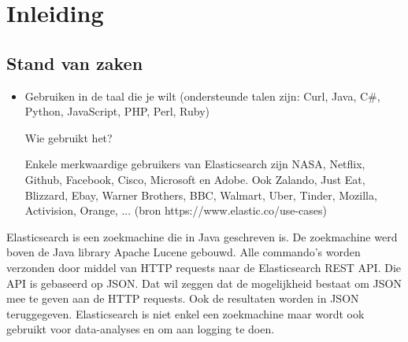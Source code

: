 
\chapter{Inleiding}
\label{ch:inleiding}

\section{Stand van zaken}
\label{sec:stand-van-zaken}

\begin{itemize}
	\item Gebruiken in de taal die je wilt (ondersteunde talen zijn: Curl, Java, C\#, Python, JavaScript, PHP, Perl, Ruby)
	
	Wie gebruikt het? 
	
	Enkele merkwaardige gebruikers van Elasticsearch zijn NASA, Netflix, Github, Facebook, Cisco, Microsoft en Adobe. Ook Zalando, Just Eat, Blizzard, Ebay, Warner Brothers, BBC, Walmart, Uber, Tinder, Mozilla, Activision, Orange, ... (bron https://www.elastic.co/use-cases)
	
\end{itemize}

Elasticsearch is een zoekmachine die in Java geschreven is. De zoekmachine werd boven de Java library Apache Lucene gebouwd. Alle commando's worden verzonden door middel van HTTP requests naar de Elasticsearch REST API. Die API is gebaseerd op JSON. Dat wil zeggen dat de mogelijkheid bestaat om JSON mee te geven aan de HTTP requests. Ook de resultaten worden in JSON teruggegeven. Elasticsearch is niet enkel een zoekmachine maar wordt ook gebruikt voor data-analyses en om aan logging te doen. 

